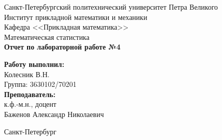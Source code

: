 \begin{titlepage}	%

	\begin{center}		%

		\large Санкт-Петербургский политехнический университет Петра Великого\\
		\large Институт прикладной математики и механики \\
		\large Кафедра <<Прикладная математика>>\\[6cm]
		
		\huge Математическая статистика\\[0.5cm] %
		\large \textbf{Отчет по лабораторной работе №4}\\[5.1cm]

	\end{center}


	\begin{flushright} %
		\begin{minipage}{0.25\textwidth} %
			\begin{flushleft} %

				\large\textbf{Работу выполнил:}\\
				\large Колесник В.Н.\\
				\large {Группа:} 3630102/70201\\
				
				\large \textbf{Преподаватель:}\\
				\large к.ф.-м.н., доцент\\
				\large Баженов Александр Николаевич

			\end{flushleft}
		\end{minipage}
	\end{flushright}
	
	\vfill %

	\begin{center}
	\large Санкт-Петербург\\
	\large \the\year %
	\end{center} %

\end{titlepage} %

\vfill %
